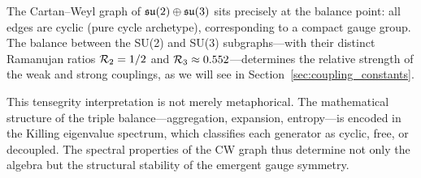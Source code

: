 The Cartan--Weyl graph of $\mathfrak{su}(2) \oplus \mathfrak{su}(3)$ sits precisely at the balance point: all edges are cyclic (pure cycle archetype), corresponding to a compact gauge group. The balance between the SU(2) and SU(3) subgraphs---with their distinct Ramanujan ratios $\mathcal{R}_2 = 1/2$ and $\mathcal{R}_3 \approx 0.552$---determines the relative strength of the weak and strong couplings, as we will see in Section~\ref{sec:coupling_constants}.

This tensegrity interpretation is not merely metaphorical. The mathematical structure of the triple balance---aggregation, expansion, entropy---is encoded in the Killing eigenvalue spectrum, which classifies each generator as cyclic, free, or decoupled. The spectral properties of the CW graph thus determine not only the algebra but the structural stability of the emergent gauge symmetry.
